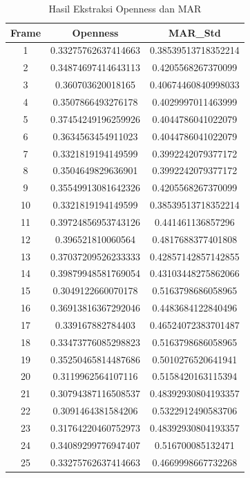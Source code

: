 \begin{longtable}{|c|c|c|}
  \caption{Hasil Ekstraksi Openness dan MAR}
  \label{tb:openessMar}                                   \\
  \hline
  \rowcolor[HTML]{C0C0C0}
  \textbf{Frame} & \textbf{Openness} & \textbf{MAR\_Std} \\
  \hline
  1     & 0.33275762637414663 & 0.38539513718352214 \\
2     & 0.34874697414643113 & 0.4205568267370099  \\
3     & 0.360703620018165   & 0.40674460840998033 \\
4     & 0.3507866493276178  & 0.4029997011463999  \\
5     & 0.37454249196259926 & 0.4044786041022079  \\
6     & 0.3634563454911023  & 0.4044786041022079  \\
7     & 0.3321819194149599  & 0.3992242079377172  \\
8     & 0.3504649829636901  & 0.3992242079377172  \\
9     & 0.35549913081642326 & 0.4205568267370099  \\
10    & 0.3321819194149599  & 0.38539513718352214 \\
11    & 0.39724856953743126 & 0.441461136857296   \\
12    & 0.396521810060564   & 0.4817688377401808  \\
13    & 0.37037209526233333 & 0.42857142857142855 \\
14    & 0.39879948581769054 & 0.43103448275862066 \\
15    & 0.3049122660070178  & 0.5163798686058965  \\
16    & 0.36913816367292046 & 0.4483684122840496  \\
17    & 0.339167882784403   & 0.46524072383701487 \\
18    & 0.33473776085298823 & 0.5163798686058965  \\
19    & 0.35250465814487686 & 0.5010276520641941  \\
20    & 0.3119962564107116  & 0.5158420163115394  \\
21    & 0.30794387116508537 & 0.48392930804193357 \\
22    & 0.3091464381584206  & 0.5322912490583706  \\
23    & 0.31764220460752973 & 0.48392930804193357 \\
24    & 0.34089299776947407 & 0.516700085132471   \\
25    & 0.33275762637414663 & 0.4669998667732268  \\

\end{longtable}
